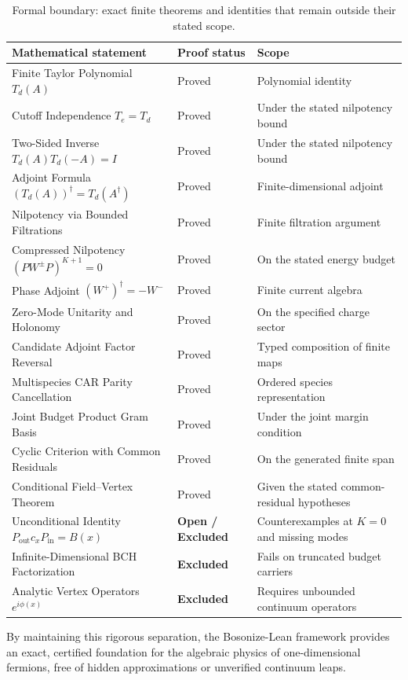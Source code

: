 \begin{table}[htbp]
\centering
\small
\begin{tabular}{p{4.5cm} p{2.5cm} p{7.0cm}}
\toprule
\textbf{Mathematical statement} & \textbf{Proof status} & \textbf{Scope} \\
\midrule
Finite Taylor Polynomial $T_d(A)$ & Proved & Polynomial identity \\
Cutoff Independence $T_e = T_d$ & Proved & Under the stated nilpotency bound \\
Two-Sided Inverse $T_d(A) T_d(-A) = I$ & Proved & Under the stated nilpotency bound \\
Adjoint Formula $(T_d(A))^\dagger = T_d(A^\dagger)$ & Proved & Finite-dimensional adjoint \\
Nilpotency via Bounded Filtrations & Proved & Finite filtration argument \\
Compressed Nilpotency $(P W^\pm P)^{K+1} = 0$ & Proved & On the stated energy budget \\
Phase Adjoint $(W^+)^\dagger = -W^-$ & Proved & Finite current algebra \\
Zero-Mode Unitarity and Holonomy & Proved & On the specified charge sector \\
Candidate Adjoint Factor Reversal & Proved & Typed composition of finite maps \\
Multispecies CAR Parity Cancellation & Proved & Ordered species representation \\
Joint Budget Product Gram Basis & Proved & Under the joint margin condition \\
Cyclic Criterion with Common Residuals & Proved & On the generated finite span \\
Conditional Field--Vertex Theorem & Proved & Given the stated common-residual hypotheses \\
\midrule
Unconditional Identity $P_{\mathrm{out}} c_x P_{\mathrm{in}} = B(x)$ & \textbf{Open / Excluded} & Counterexamples at $K=0$ and missing modes \\
Infinite-Dimensional BCH Factorization & \textbf{Excluded} & Fails on truncated budget carriers \\
Analytic Vertex Operators $e^{i \phi(x)}$ & \textbf{Excluded} & Requires unbounded continuum operators \\
\bottomrule
\end{tabular}
\caption{Formal boundary: exact finite theorems and identities that remain outside their stated scope.}
\label{tab:verification_boundary}
\end{table}

By maintaining this rigorous separation, the \textsf{Bosonize-Lean} framework provides an exact, certified foundation for the algebraic physics of one-dimensional fermions, free of hidden approximations or unverified continuum leaps.
